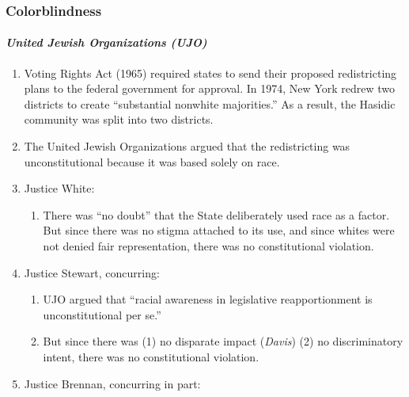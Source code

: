 \subsubsection{Colorblindness}

\paragraph{\emph{United Jewish Organizations (UJO)}}

\begin{enumerate}
    \item Voting Rights Act (1965) required states to send their proposed 
    redistricting plans to the federal government for approval. In 1974, New 
    York redrew two districts to create ``substantial nonwhite majorities.'' 
    As a result, the Hasidic community was split into two districts.
    \item The United Jewish Organizations argued that the redistricting was 
    unconstitutional because it was based solely on race.
    \item Justice White:
    \begin{enumerate}
        \item There was ``no doubt'' that the State deliberately used race as 
        a factor. But since there was no stigma attached to its use, and since 
        whites were not denied fair representation, there was no 
        constitutional violation.
    \end{enumerate}
    \item Justice Stewart, concurring:
    \begin{enumerate}
        \item UJO argued that ``racial awareness in legislative 
        reapportionment is unconstitutional per se.''
        \item But since there was (1) no disparate impact (\emph{Davis}) (2) 
        no discriminatory intent, there was no constitutional violation.
    \end{enumerate}
    \item Justice Brennan, concurring in part:
\end{enumerate}

